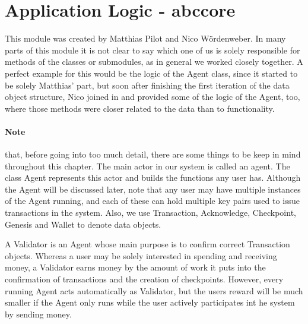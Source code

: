 \section{Application Logic - abccore}

This module was created by Matthias Pilot and Nico Wördenweber. In many parts of this module it is not clear to say which one of us is solely responsible for methods of the classes or submodules, as in general we worked closely together. A perfect example for this would be the logic of the Agent class, since it started to be solely Matthias' part, but soon after finishing the first iteration of the data object structure, Nico joined in and provided some of the logic of the Agent, too, where those methods were closer related to the data than to functionality.

\paragraph{Note} that, before going into too much detail, there are some things to be keep in mind throughout this chapter. The main actor in our system is called an agent. The class Agent represents this actor and builds the functions any user has. Although the Agent will be discussed later, note that any user may have multiple instances of the Agent running, and each of these can hold multiple key pairs used to issue transactions in the system. Also, we use Transaction, Acknowledge, Checkpoint, Genesis and Wallet to denote data objects.

A Validator is an Agent whose main purpose is to confirm correct Transaction objects. Whereas a user may be solely interested in spending and receiving money, a Validator earns money by the amount of work it puts into the confirmation of transactions and the creation of checkpoints. However, every running Agent acts automatically as Validator, but the users reward will be much smaller if the Agent only runs while the user actively participates int he system by sending money.





